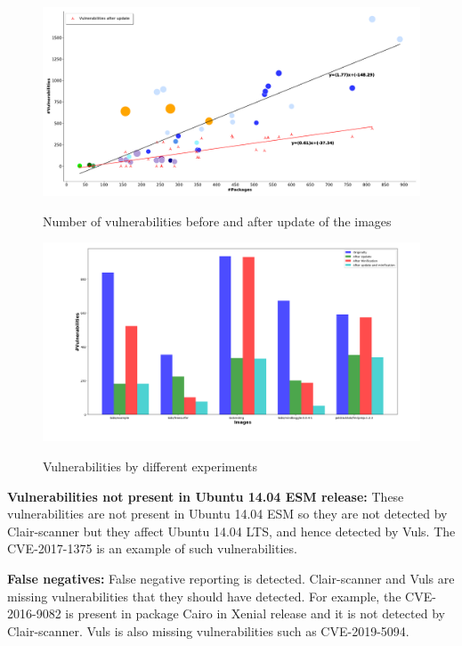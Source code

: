 \documentclass[a4paper,num-refs]{oup-contemporary}
\begin{document}
\begin{figure}[!ht]
        {\includegraphics[width=\textwidth]
        {Figures/vulnwithupdate.pdf}}
        \caption{\label{fig:graph2} Number of vulnerabilities before and
        after update of the images}
      \end{figure}


\begin{figure}[!ht]
        {\includegraphics[scale=1.5,width=\textwidth]
        {Figures/bargraph.png}}
        \caption{\label{fig:bargraph} Vulnerabilities by different experiments}
      \end{figure}
\textbf{Vulnerabilities not present in Ubuntu 14.04 ESM release:} These vulnerabilities are not present in Ubuntu 14.04 ESM so they 
are not detected by Clair-scanner but they affect Ubuntu 14.04 LTS, and hence detected by Vuls. The CVE-2017-1375 is an example
of such vulnerabilities.

\textbf{False negatives:} False negative reporting is detected. Clair-scanner and Vuls
are missing vulnerabilities that they should have detected. For example, the CVE-2016-9082 
is present in package Cairo in Xenial release and it is not detected by Clair-scanner.
Vuls is also missing vulnerabilities such as CVE-2019-5094.
\end{document}
